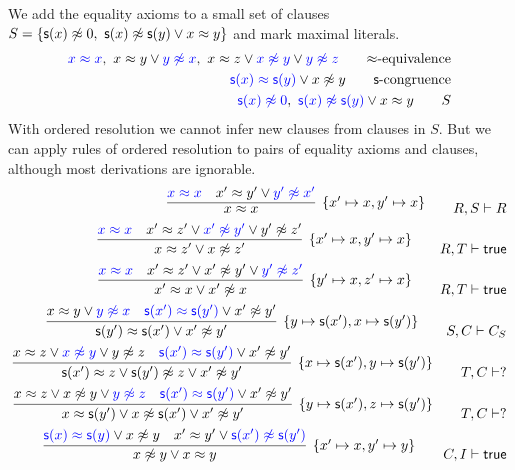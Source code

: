 \begin{example}
	We add the equality axioms to a small set of clauses
	\(S = \{ \mathsf{s}(x)\not\approx 0,\ \mathsf{s}(x)\not\approx\mathsf{s}(y)\lor x\approx y \}\) and mark maximal literals.
	\begin{align*}
	{\colN x \mEQ x},\
	x \mEQ y \lor {\colN y \mNE x},\
	x \mEQ z \lor {\colN x \mNE y} \lor {\colN y\mNE z}
\tag*{\(\mEQ\)-equivalence}
\\
	{\colN \msucc(x) \mEQ \msucc(y)} \lor x\mNE y
	\tag*{\(\msucc\)-congruence}
\\
	{\colN \msucc(x)\mNE 0},\
	{\colN \msucc(x) \mNE \msucc(y)} \lor x \mEQ y
\tag*{\(S\)}
	\end{align*}
	With ordered resolution we cannot infer new clauses from clauses in \(S\).
	But we can apply rules of ordered resolution to pairs of equality axioms and clauses,
	although most derivations are ignorable.
	\begin{align*}
\infer[\{x'\mapsto x, y'\mapsto x\}]
{x \mEQ x}
{{\colN x \mEQ x} & x' \mEQ y' \lor {\colN y' \mNE x'}}
\tag*{\(R,S\proves R\)}
\\
\infer[\{x'\mapsto x,y'\mapsto x \}]
{x\mEQ z'\lor x\mNE z'  }
{{\colN x \mEQ x} & x' \mEQ z' \lor {\colN x' \mNE y'} \lor {y'\mNE z'}}
\tag*{\(R,T\proves\true\)}
\\
\infer[\{y'\mapsto x, z'\mapsto x \}]
{x'\mEQ x\lor x'\mNE x  }
{{\colN x \mEQ x} & x' \mEQ z' \lor {x' \mNE y'} \lor {\colN y'\mNE z'}}
\tag*{\(R,T\proves\true\)}
\\
\infer[\{y\mapsto \msucc(x'), x\mapsto\msucc(y')\}]
{\msucc(y')\mEQ\msucc(x')\lor x'\mNE y'}
{x \mEQ y \lor {\colN y \mNE x} & {\colN \msucc(x') \mEQ \msucc(y')} \lor x'\mNE y'}
\tag*{\(S,C\proves C_S\)}
\\
\infer[\{x\mapsto\msucc(x'),y\mapsto\msucc(y')\}]
{\msucc(x')\mEQ z\lor \msucc(y')\mNE z \lor x'\mNE y'}
{x \mEQ z \lor {\colN x \mNE y} \lor {y\mNE z} & {\colN \msucc(x') \mEQ \msucc(y')} \lor x'\mNE y'}
\tag*{\(T,C\proves ?\)}
\\
\infer[\{y\mapsto\msucc(x'),z\mapsto\msucc(y')\}]
{x\mEQ\msucc(y')\lor x\mNE\msucc(x')\lor x'\mNE y'}
{x \mEQ z \lor {x \mNE y} \lor {\colN y\mNE z} & {\colN \msucc(x') \mEQ \msucc(y')} \lor x'\mNE y'}
\tag*{\(T,C\proves ?\)}
\\
\infer[\{x'\mapsto x, y'\mapsto y\}]
{x\mNE y\lor x\mEQ y}
{{\colN \msucc(x) \mEQ \msucc(y)} \lor x\mNE y & x' \mEQ y' \lor {\colN \msucc(x') \mNE \msucc(y')}}
\tag*{\(C,I\proves\true\)}
\\
	\end{align*}
\end{example}

